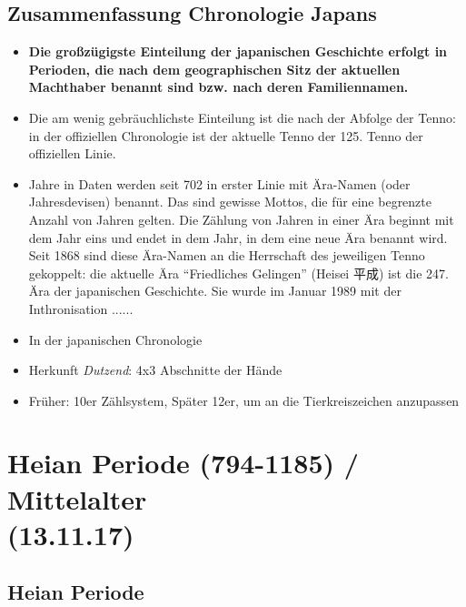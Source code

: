 \documentclass[emulatestandardclasses]{scrartcl}
\begin{document}
\subsection{Zusammenfassung Chronologie Japans}

\begin{itemize}
  \item \textbf{Die großzügigste Einteilung der japanischen Geschichte erfolgt in Perioden, die nach dem geographischen Sitz der aktuellen Machthaber benannt sind bzw. nach deren Familiennamen.}
  \item Die am wenig gebräuchlichste Einteilung ist die nach der Abfolge der Tenno: in der offiziellen Chronologie ist der aktuelle Tenno der 125. Tenno der offiziellen Linie.
  \item Jahre in Daten werden seit 702 in erster Linie mit Ära-Namen (oder Jahresdevisen) benannt. Das sind gewisse Mottos, die für eine begrenzte Anzahl von Jahren gelten. Die Zählung von Jahren in einer Ära beginnt mit dem Jahr eins und endet in dem Jahr, in dem eine neue Ära benannt wird. Seit 1868 sind diese Ära-Namen an die Herrschaft des jeweiligen Tenno gekoppelt: die aktuelle Ära "`Friedliches Gelingen"' (Heisei 平成) ist die 247. Ära der japanischen Geschichte. Sie wurde im Januar 1989 mit der Inthronisation ......
  \item In der japanischen Chronologie
  \item Herkunft \emph{Dutzend}: 4x3 Abschnitte der Hände
  \item Früher: 10er Zählsystem, Später 12er, um an die Tierkreiszeichen anzupassen
\end{itemize}

\section{Heian Periode (794-1185) / Mittelalter\\(13.11.17)}

\subsection{Heian Periode}
\end{document}
